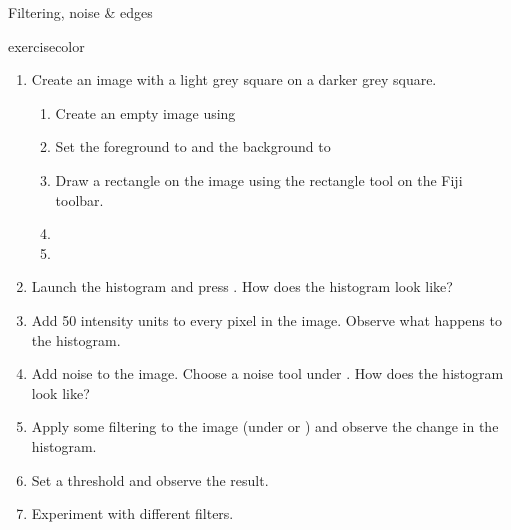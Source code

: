 \documentclass[ignorenonframetext,aspectratio=169,10pt,xcolor=table]{beamer}
\begin{document}
\begin{frame}{Filtering, noise \& edges}
  \begin{beamercolorbox}[rounded=true, shadow=true, wd=\textwidth, sep=-1em]{exercisecolor}%
    \begin{enumerate}
      \item Create an image with a light grey square on a darker grey
            square.
            \begin{enumerate}
              \item Create an empty image using 
              \item {} Set the foreground to  and the background to 
              \item Draw a rectangle on the image using the rectangle tool on the Fiji toolbar.
              \item {}
              \item {}
            \end{enumerate}
      \item Launch the histogram and press . How does the histogram look like?
      \item Add 50 intensity units to every pixel in the image.   Observe what happens to the histogram.
      \item Add noise to the image. Choose a noise tool under   . How does the histogram look like?
      \item Apply some filtering to the image (under  or ) and observe the change in the histogram.
      \item Set a threshold and observe the result.
      \item  Experiment with different filters.
    \end{enumerate}
  \end{beamercolorbox}
\end{frame}
\end{document}
